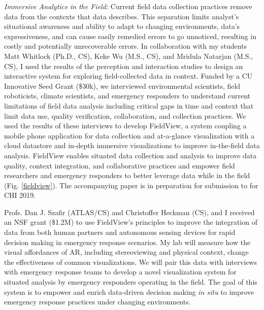 \documentclass[11pt]{article}
\begin{document}
\emph{Immersive Analytics in the Field:} Current field data collection practices remove data from the contexts that data describes. This separation limits analyst's situational awareness and ability to adapt to changing environments, data's expressiveness, and can cause easily remedied errors to go unnoticed, resulting in costly and potentially unrecoverable errors. In collaboration with my students Matt Whitlock (Ph.D., CS), Keke Wu (M.S., CS), and Mridula Natarjan (M.S., CS), I used the results of the perception \cite{diaz2017designing} and interaction \cite{whitlock2018Distal} studies to design an interactive system for exploring field-collected data in context. Funded by a CU Innovative Seed Grant (\$30k), we interviewed environmental scientists, field roboticists, climate scientists, and emergency responders to understand current limitations of field data analysis including critical gaps in time and context that limit data use, quality verification, collaboration, and collection practices. We used the results of these interviews to develop FieldView, a system coupling a mobile phone application for data collection and at-a-glance visualization with a cloud datastore and in-depth immersive visualizations to improve in-the-field data analysis. 
FieldView enables situated data collection and analysis to improve data quality, context integration, and collaborative practices and empower field researchers and emergency responders to better leverage data while in the field (Fig. \ref{fieldview}). The accompanying paper is in preparation for submission to for CHI 2019. 

Profs. Dan J. Szafir (ATLAS/CS) and Christoffer Heckman (CS), and I received an NSF grant (\$1.2M) to use FieldView's principles to improve the integration of data from both human partners and autonomous sensing devices for rapid decision making in emergency response scenarios. My lab will measure how the visual affordances of AR, including stereoviewing and physical context, change the effectiveness of common visualizations. We will pair this data with interviews with emergency response teams to develop a novel visualization system for situated analysis by emergency responders operating in the field. The goal of this system is to empower and enrich data-driven decision making \emph{in situ} to improve emergency response practices under changing environments. 
\end{document}
